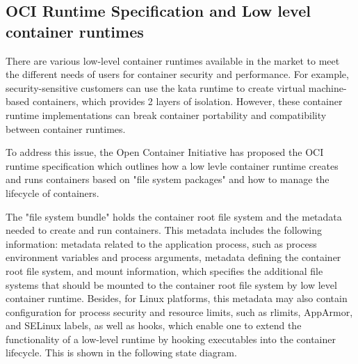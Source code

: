 \subsection{OCI Runtime Specification and Low level container runtimes}
There are various low-level container runtimes available in the market to meet the different needs of users for container security and performance. For example, security-sensitive customers can use the kata runtime to create virtual machine-based 
containers, which provides 2 layers of isolation. However, these container runtime implementations can break container portability and compatibility between container runtimes.

To address this issue, the Open Container Initiative has proposed the OCI runtime specification which outlines how a low levle container runtime creates and runs containers based on "file system packages" and how to manage the lifecycle of containers.

The "file system bundle" holds the container root file system and the metadata needed to create and run containers. This metadata includes the following information: metadata related to the application process, such as process environment variables 
and process arguments, metadata defining the container root file system, and mount information, which specifies the additional file systems that should be mounted to the container root file system by low level container runtime. Besides, for Linux 
platforms, this metadata may also contain configuration for process security and resource limits, such as rlimits, AppArmor, and SELinux labels, as well as hooks, which enable one to extend the functionality of a low-level runtime by hooking 
executables into the container lifecycle. This is shown in the following state diagram.

